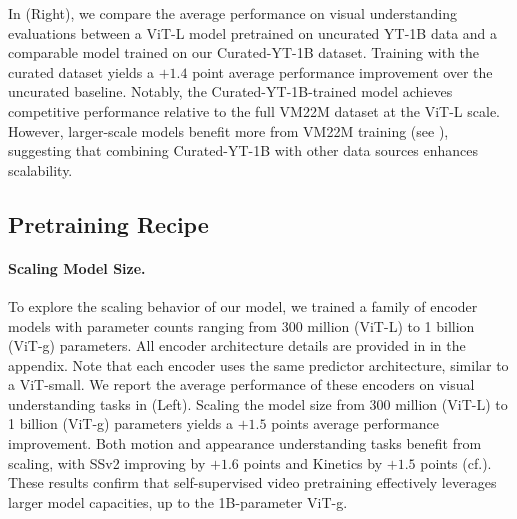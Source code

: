 \documentclass[]{kling/kling}
\begin{document}
In  (Right), we compare the average performance on visual understanding evaluations between a ViT-L model pretrained on uncurated YT-1B data and a comparable model trained on our Curated-YT-1B dataset. Training with the curated dataset yields a $+1.4$ point average performance improvement over the uncurated baseline. Notably, the Curated-YT-1B-trained model achieves competitive performance relative to the full VM22M dataset at the ViT-L scale. However, larger-scale models benefit more from VM22M training (see ), suggesting that combining Curated-YT-1B with other data sources enhances scalability.


\subsection{Pretraining Recipe}
\label{subsec:model_training}

\paragraph{\bf Scaling Model Size.}
To explore the scaling behavior of our model, we trained a family of encoder models with parameter counts ranging from 300 million (ViT-L) to 1 billion (ViT-g) parameters. All encoder architecture details are provided in  in the appendix. Note that each encoder uses the same predictor architecture, similar to a ViT-small.
We report the average performance of these encoders on visual understanding tasks in  (Left). Scaling the model size from 300 million (ViT-L) to 1 billion (ViT-g) parameters yields a $+1.5$ points average performance improvement. Both motion and appearance understanding tasks benefit from scaling, with SSv2 improving by $+1.6$ points and Kinetics by $+1.5$ points (cf.). These results confirm that self-supervised video pretraining effectively leverages larger model capacities, up to the 1B-parameter ViT-g.
\end{document}
